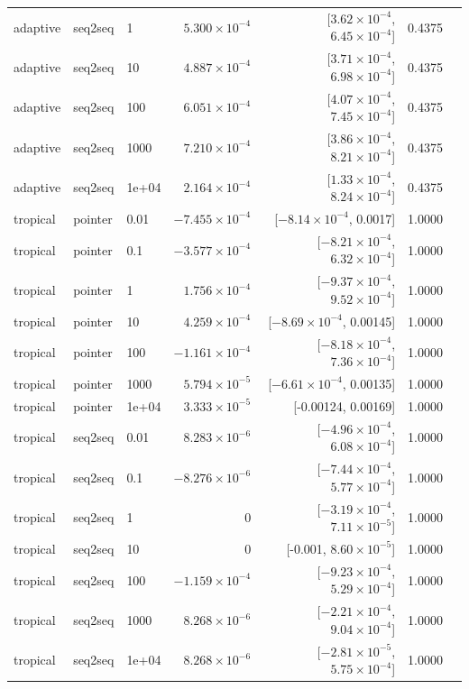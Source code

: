 \documentclass[10pt]{article}
\begin{document}
{\begin{longtable}{lllrrrl}
adaptive & seq2seq & 1 & $5.300\times10^{-4}$ & [$3.62\times10^{-4}$, $6.45\times10^{-4}$] & 0.4375 & \\
adaptive & seq2seq & 10 & $4.887\times10^{-4}$ & [$3.71\times10^{-4}$, $6.98\times10^{-4}$] & 0.4375 & \\
adaptive & seq2seq & 100 & $6.051\times10^{-4}$ & [$4.07\times10^{-4}$, $7.45\times10^{-4}$] & 0.4375 & \\
adaptive & seq2seq & 1000 & $7.210\times10^{-4}$ & [$3.86\times10^{-4}$, $8.21\times10^{-4}$] & 0.4375 & \\
adaptive & seq2seq & 1e+04 & $2.164\times10^{-4}$ & [$1.33\times10^{-4}$, $8.24\times10^{-4}$] & 0.4375 & \\
tropical & pointer & 0.01 & $-7.455\times10^{-4}$ & [$-8.14\times10^{-4}$, 0.0017] & 1.0000 & \\
tropical & pointer & 0.1 & $-3.577\times10^{-4}$ & [$-8.21\times10^{-4}$, $6.32\times10^{-4}$] & 1.0000 & \\
tropical & pointer & 1 & $1.756\times10^{-4}$ & [$-9.37\times10^{-4}$, $9.52\times10^{-4}$] & 1.0000 & \\
tropical & pointer & 10 & $4.259\times10^{-4}$ & [$-8.69\times10^{-4}$, 0.00145] & 1.0000 & \\
tropical & pointer & 100 & $-1.161\times10^{-4}$ & [$-8.18\times10^{-4}$, $7.36\times10^{-4}$] & 1.0000 & \\
tropical & pointer & 1000 & $5.794\times10^{-5}$ & [$-6.61\times10^{-4}$, 0.00135] & 1.0000 & \\
tropical & pointer & 1e+04 & $3.333\times10^{-5}$ & [-0.00124, 0.00169] & 1.0000 & \\
tropical & seq2seq & 0.01 & $8.283\times10^{-6}$ & [$-4.96\times10^{-4}$, $6.08\times10^{-4}$] & 1.0000 & \\
tropical & seq2seq & 0.1 & $-8.276\times10^{-6}$ & [$-7.44\times10^{-4}$, $5.77\times10^{-4}$] & 1.0000 & \\
tropical & seq2seq & 1 & 0 & [$-3.19\times10^{-4}$, $7.11\times10^{-5}$] & 1.0000 & \\
tropical & seq2seq & 10 & 0 & [-0.001, $8.60\times10^{-5}$] & 1.0000 & \\
tropical & seq2seq & 100 & $-1.159\times10^{-4}$ & [$-9.23\times10^{-4}$, $5.29\times10^{-4}$] & 1.0000 & \\
tropical & seq2seq & 1000 & $8.268\times10^{-6}$ & [$-2.21\times10^{-4}$, $9.04\times10^{-4}$] & 1.0000 & \\
tropical & seq2seq & 1e+04 & $8.268\times10^{-6}$ & [$-2.81\times10^{-5}$, $5.75\times10^{-4}$] & 1.0000 & \\

\end{longtable}}
\end{document}
